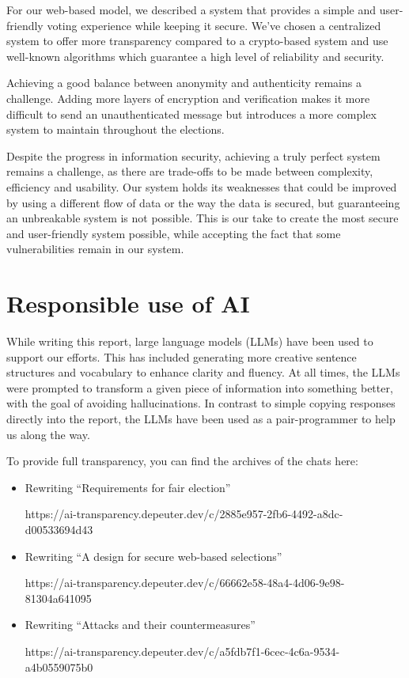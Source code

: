 \documentclass[a4paper,12pt,english]{article}
\begin{document}
For our web-based model, we described a system that provides a simple and user-friendly voting experience while keeping it secure. We’ve chosen a centralized system to offer more transparency compared to a crypto-based system and use well-known algorithms which guarantee a high level of reliability and security.

Achieving a good balance between anonymity and authenticity remains a challenge. Adding more layers of encryption and verification makes it more difficult to send an unauthenticated message but introduces a more complex system to maintain throughout the elections.

Despite the progress in information security, achieving a truly perfect system remains a challenge, as there are trade-offs to be made between complexity, efficiency and usability. Our system holds its weaknesses that could be improved by using a different flow of data or the way the data is secured, but guaranteeing an unbreakable system is not possible. This is our take to create the most secure and user-friendly system possible, while accepting the fact that some vulnerabilities remain in our system.

\newpage

\printbibliography

\newpage

\appendix

\section{Responsible use of AI}\label{sec:ai}

While writing this report, large language models (LLMs) have been used to support our efforts. This has included generating more creative sentence structures and vocabulary to enhance clarity and fluency. At all times, the LLMs were prompted to transform a given piece of information into something better, with the goal of avoiding hallucinations. In contrast to simple copying responses directly into the report, the LLMs have been used as a pair-programmer to help us along the way.

To provide full transparency, you can find the archives of the chats here:

\begin{itemize}
    \item Rewriting “Requirements for fair election” 

    https://ai-transparency.depeuter.dev/c/2885e957-2fb6-4492-a8dc-d00533694d43 

    \item Rewriting “A design for secure web-based selections” 

    https://ai-transparency.depeuter.dev/c/66662e58-48a4-4d06-9e98-81304a641095 

    \item Rewriting “Attacks and their countermeasures” 

    https://ai-transparency.depeuter.dev/c/a5fdb7f1-6cec-4c6a-9534-a4b0559075b0 
\end{itemize}
\end{document}
